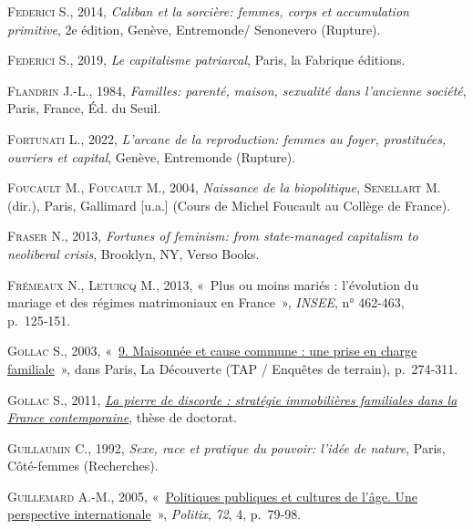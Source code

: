 \documentclass[
  12pt,
]{book}
\newlength{\cslhangindent}
\newenvironment{CSLReferences}[2] %
 {\begin{list}{}{%
  \setlength{\itemindent}{0pt}
  \setlength{\leftmargin}{0pt}
  \setlength{\parsep}{0pt}
  \ifodd #1
   \setlength{\leftmargin}{\cslhangindent}
   \setlength{\itemindent}{-1\cslhangindent}
  \fi
  \setlength{\itemsep}{#2\baselineskip}}}
 {\end{list}}
\begin{document}
\begin{CSLReferences}{0}{1}
\textsc{Federici S.}, 2014, \emph{Caliban et la sorcière: femmes, corps
et accumulation primitive}, 2e édition, Genève, Entremonde/ Senonevero
(Rupture).

\textsc{Federici S.}, 2019, \emph{Le capitalisme patriarcal}, Paris, la
Fabrique éditions.

\textsc{Flandrin J.-L.}, 1984, \emph{Familles: parenté, maison,
sexualité dans l'ancienne société}, Paris, France, Éd. du Seuil.

\textsc{Fortunati L.}, 2022, \emph{L'arcane de la reproduction: femmes
au foyer, prostituées, ouvriers et capital}, Genève, Entremonde
(Rupture).

\textsc{Foucault M.}, \textsc{Foucault M.}, 2004, \emph{Naissance de la
biopolitique}, \textsc{Senellart M.} (dir.), Paris, Gallimard {[}u.a.{]}
(Cours de Michel Foucault au Collège de France).

\textsc{Fraser N.}, 2013, \emph{Fortunes of feminism: from state-managed
capitalism to neoliberal crisis}, Brooklyn, NY, Verso Books.

\textsc{Frémeaux N.}, \textsc{Leturcq M.}, 2013, {«~Plus ou moins mariés
: l{'}évolution du mariage et des régimes matrimoniaux en France~»},
\emph{INSEE}, n° 462-463, p.~125‑151.

\textsc{Gollac S.}, 2003,
{«~\href{https://www.cairn.info/charges-de-famille--9782707141347-p-274.htm}{9.
Maisonnée et cause commune : une prise en charge familiale}~»}, dans
Paris, La Découverte (TAP / Enquêtes de terrain), p.~274‑311.

\textsc{Gollac S.}, 2011, \emph{\href{https://theses.fr/2011EHES0045}{La
pierre de discorde : stratégie immobilières familiales dans la France
contemporaine}}, thèse de doctorat.

\textsc{Guillaumin C.}, 1992, \emph{Sexe, race et pratique du pouvoir:
l'idée de nature}, Paris, Côté-femmes (Recherches).

\textsc{Guillemard A.-M.}, 2005,
{«~\href{https://doi.org/10.3917/pox.072.0079}{Politiques publiques et
cultures de l'âge. Une perspective internationale}~»}, \emph{Politix},
\emph{72}, 4, p.~79‑98.


\end{CSLReferences}
\end{document}
